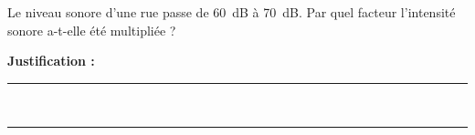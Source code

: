 Le niveau sonore d'une rue passe de \qty{60}{dB} à \qty{70}{dB}. Par quel facteur l'intensité sonore a-t-elle été multipliée ?

\choices

\noindent\textbf{Justification :} \hrulefill \\[2.5ex]
\rule{\linewidth}{0.4pt} \\[2.5ex]
\rule{\linewidth}{0.4pt}
\vfill
